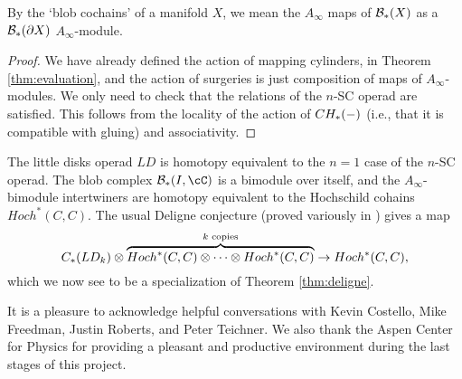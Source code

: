 \documentclass{pnastwo}
\begin{document}
\begin{article}
By the `blob cochains' of a manifold $X$, we mean the $A_\infty$ maps of ${\mathcal B}_*(X)$ as a ${\mathcal B}_*(\partial X)$ $A_\infty$-module.

\begin{proof}
We have already defined the action of mapping cylinders, in Theorem \ref{thm:evaluation}, 
and the action of surgeries is just composition of maps of $A_\infty$-modules. 
We only need to check that the relations of the $n$-SC operad are satisfied. 
This follows from the locality of the action of $CH_*(-)$ (i.e., that it is compatible with gluing) and associativity.
\end{proof} 

The little disks operad $LD$ is homotopy equivalent to 
the $n=1$ case of the $n$-SC operad. The blob complex $\bc_*(I, \cC)$ is a bimodule over itself, and the $A_\infty$-bimodule intertwiners are homotopy equivalent to the Hochschild cohains $Hoch^*(C, C)$. 
The usual Deligne conjecture (proved variously in \cite{hep-th/9403055, MR1805894, MR2064592, MR1805923}) gives a map
\[
	C_*(LD_k)\otimes \overbrace{Hoch^*(C, C)\otimes\cdots\otimes Hoch^*(C, C)}^{\text{$k$ copies}}
			\to  Hoch^*(C, C),
\]
which we now see to be a specialization of Theorem \ref{thm:deligne}.







\begin{acknowledgments}
It is a pleasure to acknowledge helpful conversations with 
Kevin Costello,
Mike Freedman,
Justin Roberts,
and
Peter Teichner.
We also thank the Aspen Center for Physics for providing a pleasant and productive
environment during the last stages of this project.
\end{acknowledgments}



\end{article}
\end{document}
